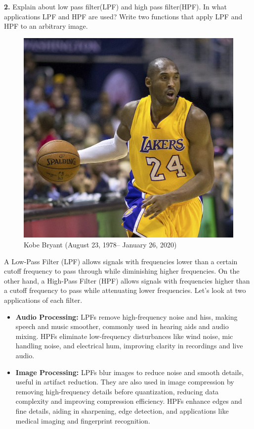 \documentclass[hidelinks,12pt]{article}
\begin{document}
	\vspace*{2\baselineskip}
	 \textbf{2.} Explain about low pass filter(LPF) and high pass filter(HPF). In what applications LPF and HPF are used? Write two functions that apply LPF and HPF to an arbitrary image.
	
	
	\begin{figure}[b!]
		\centering
		\includegraphics[scale=0.28]{figures/pic1.jpg}
		\caption{Kobe Bryant (August 23, 1978– January 26, 2020)}
		\label{fig:kobe}
	\end{figure}
	
	\pagebreak
	
	 A Low-Pass Filter (LPF) allows signals with frequencies lower than a certain cutoff frequency to pass through while diminishing higher frequencies. On the other hand, a High-Pass Filter (HPF) allows signals with frequencies higher than a cutoff frequency to pass while attenuating lower frequencies. Let's look at two applications of each filter.
	
	\begin{itemize}
		\item \textbf{Audio Processing:} LPFs remove high-frequency noise and hiss, making speech and music smoother, commonly used in hearing aids and audio mixing. HPFs eliminate low-frequency disturbances like wind noise, mic handling noise, and electrical hum, improving clarity in recordings and live audio.
		
		\item \textbf{Image Processing:} LPFs blur images to reduce noise and smooth details, useful in artifact reduction. They are also used in image compression by removing high-frequency details before quantization, reducing data complexity and improving compression efficiency. HPFs enhance edges and fine details, aiding in sharpening, edge detection, and applications like medical imaging and fingerprint recognition.
	\end{itemize}
	
\end{document}
